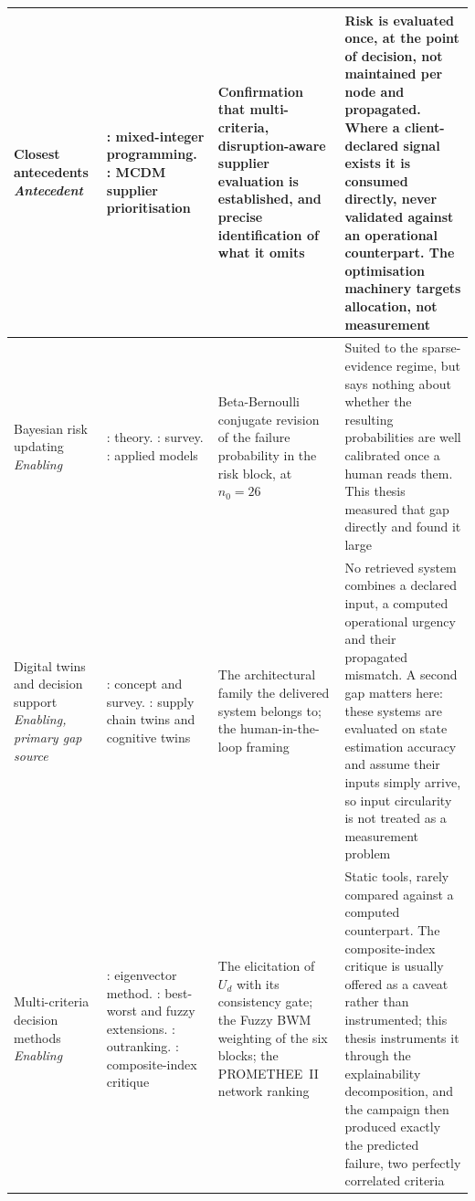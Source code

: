 \begin{longtable}{>{\raggedright\arraybackslash}p{2.6cm} >{\raggedright\arraybackslash}p{3.0cm} >{\raggedright\arraybackslash}p{3.4cm} >{\raggedright\arraybackslash}p{4.4cm}}
Closest antecedents \newline \textit{Antecedent} &
\autocite{sawik2013integrated,sawik2014joint,sawik2016integrated}: mixed-integer
programming. \autocite{cohen2021assigning,afrasiabi2022extended}: MCDM supplier
prioritisation &
Confirmation that multi-criteria, disruption-aware supplier evaluation is established, and
precise identification of what it omits &
Risk is evaluated once, at the point of decision, not maintained per node and propagated.
Where a client-declared signal exists it is consumed directly, never validated against an
operational counterpart. The optimisation machinery targets allocation, not measurement \\
\midrule

Bayesian risk updating \newline \textit{Enabling} &
\autocite{pearl1988probabilistic,koller2009probabilistic}: theory.
\autocite{hosseini2020bayesian}: survey.
\autocite{huang2020bayesian,deng2020prediction,lockamy2011bayesian,qazi2017dynamic}: applied
models &
Beta-Bernoulli conjugate revision of the failure probability in the risk block, at
$n_0 = 26$ &
Suited to the sparse-evidence regime, but says nothing about whether the resulting
probabilities are well calibrated once a human reads them. This thesis measured that gap
directly and found it large \\
\midrule

Digital twins and decision support \newline \textit{Enabling, primary gap source} &
\autocite{grieves2014digital,tao2018digital,fuller2020digital}: concept and survey.
\autocite{ivanov2021digital,ivanov2020digital,niloofar2023}: supply chain twins and
cognitive twins &
The architectural family the delivered system belongs to; the human-in-the-loop framing &
No retrieved system combines a declared input, a computed operational urgency and their
propagated mismatch. A second gap matters here: these systems are evaluated on state
estimation accuracy and assume their inputs simply arrive, so input circularity is not
treated as a measurement problem \\
\midrule

Multi-criteria decision methods \newline \textit{Enabling} &
\autocite{saaty1980analytic}: eigenvector method. \autocite{rezaei2015best,guo2017fuzzy}:
best-worst and fuzzy extensions. \autocite{brans1986promethee,brans2005promethee}:
outranking. \autocite{greco2018,becker2017,borgonovo2021global}: composite-index critique &
The elicitation of $U_d$ with its consistency gate; the Fuzzy BWM weighting of the six
blocks; the PROMETHEE~II network ranking &
Static tools, rarely compared against a computed counterpart. The composite-index critique
is usually offered as a caveat rather than instrumented; this thesis instruments it through
the explainability decomposition, and the campaign then produced exactly the predicted
failure, two perfectly correlated criteria \\
\midrule


\end{longtable}
